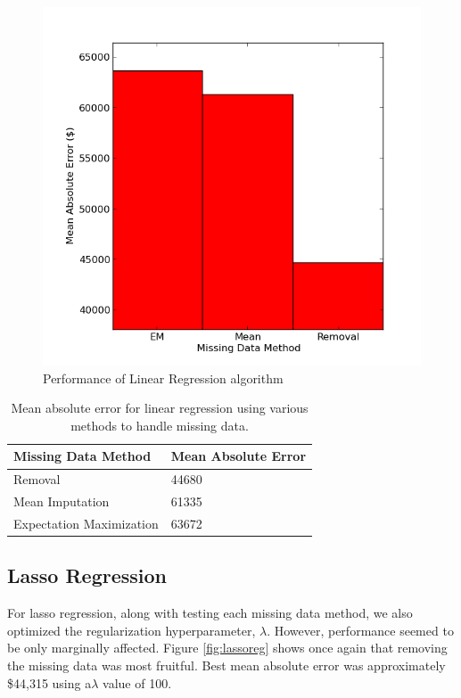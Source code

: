 \documentclass{acm_proc_article-sp}
\begin{document}
	 \begin{figure}[!htbp]
   		\centering
  		\includegraphics[width=\linewidth]{linear_regression_tuning.png}
    		\caption{Performance of Linear Regression algorithm}
    		\label{fig:linreg}
	\end{figure}
	\begin{center}
	
    \begin{table}	
    \begin{tabular}{| l | l |}
    \hline
    Missing Data Method & Mean Absolute Error \\ \hline
    \hline
    Removal & 44680 \\
    \hline
    Mean Imputation & 61335 \\
    \hline
    Expectation Maximization & 63672 \\
    \hline
    \end{tabular}
    \caption{Mean absolute error for linear regression using various methods to handle missing data.}
    \label{fig:linregres}
    \end{table}
\end{center}
\subsection{Lasso Regression}
	For lasso regression, along with testing each missing data method, we also optimized the regularization hyperparameter, $\lambda$. However, performance seemed to be only marginally affected. Figure \ref{fig:lassoreg} shows once again that removing the missing data was most fruitful. Best mean absolute error was approximately \$44,315 using a$ \lambda$ value of 100.
	
\end{document}
